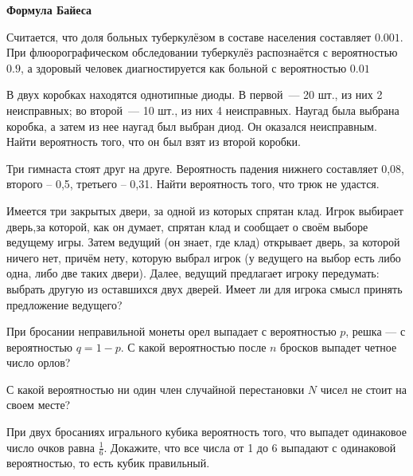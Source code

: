 \documentclass{article}
\begin{document}
    \large

    \begin{center}
        \textbf{Формула Байеса}
    \end{center}


    \begin{enumerate_boxed}

        \item Считается, что доля больных туберкулёзом в составе населения составляет $0.001$.
        При флюорографическом обследовании туберкулёз распознаётся с вероятностью $0.9$, а здоровый человек диагностируется как больной с вероятностью $0.01$

        \item В двух коробках находятся однотипные диоды.
        В первой~--- 20 шт., из них 2 неисправных; во второй~--- 10 шт., из них 4 неисправных.
        Наугад была выбрана коробка, а затем из нее наугад был выбран диод.
        Он оказался неисправным.
        Найти вероятность того, что он был взят из второй коробки.

        \item Три гимнаста стоят друг на друге.
        Вероятность падения нижнего составляет 0,08, второго – 0,5, третьего – 0,31.
        Найти вероятность того, что трюк не удастся.

        \item Имеется три закрытых двери, за одной из которых спрятан клад.
        Игрок выбирает дверь,за которой, как он думает, спрятан клад и сообщает о своём выборе ведущему игры.
        Затем ведущий (он знает, где клад) открывает дверь, за которой ничего нет, причём нету, которую выбрал игрок (у ведущего на выбор есть либо одна, либо две таких двери).
        Далее, ведущий предлагает игроку передумать: выбрать другую из оставшихся двух дверей.
        Имеет ли для игрока смысл принять предложение ведущего?

        \item При бросании неправильной монеты орел выпадает с вероятностью $p$, решка — с вероятностью $q = 1-p$.
        С какой вероятностью после $n$ бросков выпадет четное число орлов?

        \item С какой вероятностью ни один член случайной перестановки $N$ чисел не стоит на своем месте?

        \item При двух бросаниях игрального кубика вероятность того, что выпадет одинаковое число очков равна $\frac{1}{6}.$ Докажите, что все числа от 1 до 6 выпадают с одинаковой вероятностью, то есть кубик правильный.


\end{enumerate_boxed}
\end{document}
